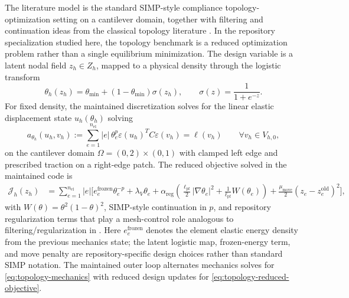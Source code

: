 The literature model is the standard SIMP-style compliance topology-optimization
setting on a cantilever domain, together with filtering and continuation ideas
from the classical topology literature
\citep{bendsoe2003topology,sigmund2001topology,ferrari2020top99,bourdin2001filters}.
In the repository specialization studied here, the topology benchmark is a
reduced optimization problem rather than a single equilibrium minimization. The
design variable is a latent nodal field
$z_h \in Z_h$, mapped to a physical density through the logistic transform
\begin{equation}
  \theta_h(z_h)
  =
  \theta_{\min} + (1-\theta_{\min}) \sigma(z_h),
  \qquad
  \sigma(z) = \frac{1}{1+e^{-z}}.
  \label{eq:topology-density-map}
\end{equation}
For fixed density, the maintained discretization solves for the linear elastic
displacement state
$u_h(\theta_h)$ solving
\begin{equation}
  a_{\theta_h}(u_h,v_h)
  :=
  \sum_{e=1}^{n_{\mathrm{el}}}
    |e|\,\theta_e^{p}
    \varepsilon(u_h)^T C \varepsilon(v_h)
  =
  \ell(v_h)
  \qquad \forall v_h \in V_{h,0},
  \label{eq:topology-mechanics}
\end{equation}
on the cantilever domain $\Omega = (0,2)\times(0,1)$ with clamped left edge
and prescribed traction on a right-edge patch. The reduced objective solved in
the maintained code is
\begin{align}
  \mathcal{J}_h(z_h)
  &=
  \sum_{e=1}^{n_{\mathrm{el}}}
  |e|
  \Bigg[
    e_e^{\mathrm{frozen}} \theta_e^{-p}
    + \lambda_V \theta_e
    + \alpha_{\mathrm{reg}}
      \left(
        \frac{\ell_{\mathrm{pf}}}{2} \lvert \nabla \theta_e \rvert^2
        + \frac{1}{\ell_{\mathrm{pf}}} W(\theta_e)
      \right)
    + \frac{\mu_{\mathrm{move}}}{2} (z_e-z_e^{\mathrm{old}})^2
  \Bigg],
  \label{eq:topology-reduced-objective}
\end{align}
with $W(\theta) = \theta^2(1-\theta)^2$, SIMP-style continuation in $p$, and
repository regularization terms that play a mesh-control role analogous to
filtering/regularization in \citet{bourdin2001filters}. Here
$e_e^{\mathrm{frozen}}$ denotes the element elastic energy density from the
previous mechanics state; the latent logistic map, frozen-energy term, and move
penalty are repository-specific design choices rather than standard SIMP
notation. The maintained outer loop alternates mechanics solves for
\cref{eq:topology-mechanics} with reduced design updates for
\cref{eq:topology-reduced-objective}.

